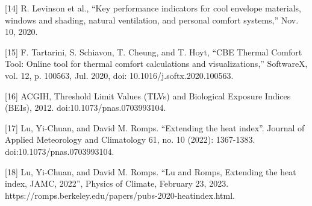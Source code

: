 {[}14{]} R. Levinson et al., ``Key performance indicators for cool envelope
materials, windows and shading, natural ventilation, and personal comfort
systems,'' Nov. 10, 2020.

{[}15{]} F. Tartarini, S. Schiavon, T. Cheung, and T. Hoyt, ``CBE Thermal
Comfort Tool: Online tool for thermal comfort calculations and visualizations,''
SoftwareX, vol. 12, p. 100563, Jul. 2020, doi: 10.1016/j.softx.2020.100563.

{[}16{]} ACGIH, Threshold Limit Values (TLVs) and Biological Exposure Indices
(BEIs), 2012. doi:10.1073/pnas.0703993104.

{[}17{]} Lu, Yi-Chuan, and David M. Romps. ``Extending the heat index''. Journal
of Applied Meteorology and Climatology 61, no. 10 (2022): 1367-1383.
doi:10.1073/pnas.0703993104.

{[}18{]} Lu, Yi-Chuan, and David M. Romps. ``Lu and Romps, Extending the heat index, JAMC, 2022'',
Physics of Climate, February 23, 2023.
https://romps.berkeley.edu/papers/pubs-2020-heatindex.html.
